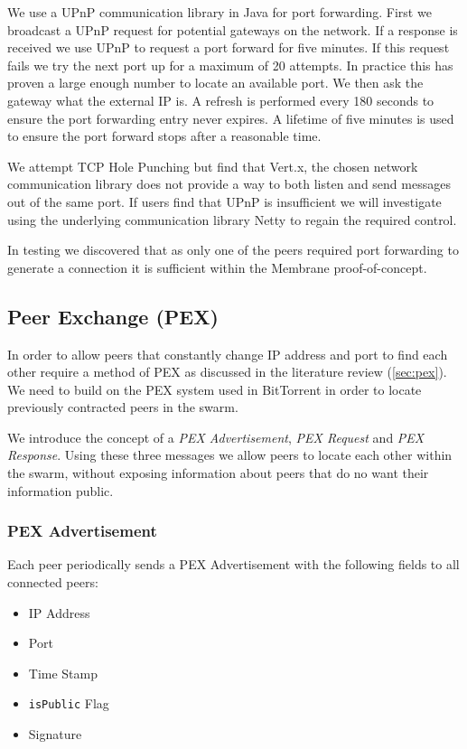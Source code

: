 \documentclass[11pt, a4paper, twoside]{report}
\def\code#1{\texttt{#1}}
\begin{document}
We use a UPnP communication library in Java for port forwarding. First we broadcast a UPnP request for potential gateways on the network. If a response is received we use UPnP to request a port forward for five minutes. If this request fails we try the next port up for a maximum of 20 attempts. In practice this has proven a large enough number to locate an available port. We then ask the gateway what the external IP is. A refresh is performed every 180 seconds to ensure the port forwarding entry never expires. A lifetime of five minutes is used to ensure the port forward stops after a reasonable time.

We attempt TCP Hole Punching but find that Vert.x, the chosen network communication library does not provide a way to both listen and send messages out of the same port. If users find that UPnP is insufficient we will investigate using the underlying communication library Netty to regain the required control.

In testing we discovered that as only one of the peers required port forwarding to generate a connection it is sufficient within the Membrane proof-of-concept.

\subsection{Peer Exchange (PEX)}

In order to allow peers that constantly change IP address and port to find each other require a method of PEX as discussed in the literature review (\ref{sec:pex}). We need to build on the PEX system used in BitTorrent in order to locate previously contracted peers in the swarm.

We introduce the concept of a \emph{PEX Advertisement}, \emph{PEX Request} and \emph{PEX Response}. Using these three messages we allow peers to locate each other within the swarm, without exposing information about peers that do no want their information public.

\subsubsection{PEX Advertisement}

Each peer periodically sends a PEX Advertisement with the following fields to all connected peers:

\begin{itemize}
 \item IP Address
 \item Port
 \item Time Stamp
 \item \code{isPublic} Flag
 \item Signature
\end{itemize}
\end{document}
